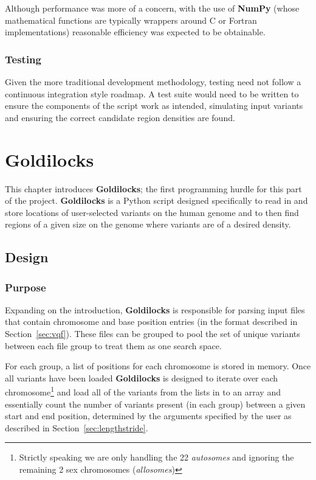 Although performance was more of a concern, with the use of \textbf{NumPy}
(whose mathematical functions are typically wrappers around C or Fortran
implementations) reasonable efficiency was expected to be obtainable.


\subsection{Testing}

Given the more traditional development methodology, testing need not follow a
continuous integration style roadmap. A test suite would need to be written to
ensure the components of the script work as intended, simulating input variants
and ensuring the correct candidate region densities are found.


\chapter{Goldilocks}

This chapter introduces \textbf{Goldilocks}; the first programming hurdle for
this part of the project. \textbf{Goldilocks} is a Python script designed
specifically to read in and store locations of user-selected variants on the
human genome and to then find regions of a given size on the genome where
variants are of a desired density.


\section{Design}
\subsection{Purpose}
\label{sec:goldilocks-purpose}

Expanding on the introduction, \textbf{Goldilocks} is responsible for parsing
input files that contain chromosome and base position entries (in the format
described in Section~\ref{sec:vqf}). These files can be grouped to pool the set
of unique variants between each file group to treat them as one search space.

For each group, a list of positions for each chromosome is stored in
memory. Once all variants have been loaded \textbf{Goldilocks} is designed to
iterate over each chromosome\footnote{Strictly speaking we are only handling the
22 \textit{autosomes} and ignoring the remaining 2 sex chromosomes
(\textit{allosomes})} and load all of the variants from the lists in to an array
and essentially count the number of variants present (in each group) between a
given start and end position, determined by the arguments specified by the user
as described in Section~\ref{sec:lengthstride}.

